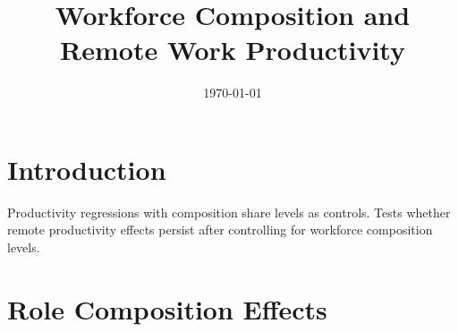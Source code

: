 \documentclass[11pt]{article}
\title{Workforce Composition and Remote Work Productivity}
\date{\today}
\begin{document}
\maketitle

\section{Introduction}

Productivity regressions with composition share levels as controls. Tests whether remote productivity effects persist after controlling for workforce composition levels.

\section{Role Composition Effects}
\end{document}
